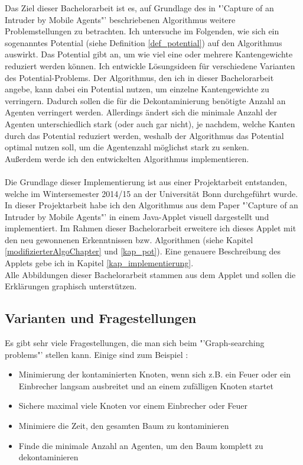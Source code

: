 Das Ziel dieser Bachelorarbeit ist es, auf Grundlage des in "'Capture of an Intruder by Mobile Agents"' \cite{cima_paper} beschriebenen Algorithmus weitere Problemstellungen zu betrachten. Ich untersuche im Folgenden, wie sich ein sogenanntes Potential (siehe Definition \ref{def_potential}) auf den Algorithmus auswirkt. Das Potential gibt an, um wie viel eine oder mehrere Kantengewichte reduziert werden können. Ich entwickle Lösungsideen für verschiedene Varianten des Potential-Problems. Der Algorithmus, den ich in dieser Bachelorarbeit angebe, kann dabei ein Potential nutzen, um einzelne Kantengewichte zu verringern. Dadurch sollen die für die Dekontaminierung benötigte Anzahl an Agenten verringert werden. Allerdings ändert sich die minimale Anzahl der Agenten unterschiedlich stark (oder auch gar nicht), je nachdem, welche Kanten durch das Potential reduziert werden, weshalb der Algorithmus das Potential optimal nutzen soll, um die Agentenzahl möglichst stark zu senken.\\
Außerdem werde ich den entwickelten Algorithmus implementieren.
\\
\\
Die Grundlage dieser Implementierung ist aus einer Projektarbeit entstanden, welche im Wintersemester 2014/15 an der Universität Bonn durchgeführt wurde.
In dieser Projektarbeit habe ich den Algorithmus aus dem Paper "'Capture of an Intruder by Mobile Agents"' \cite{cima_paper} in einem Java-Applet visuell dargestellt und implementiert. Im Rahmen dieser Bachelorarbeit erweitere ich dieses Applet mit den neu gewonnenen Erkenntnissen bzw. Algorithmen (siehe Kapitel \ref{modifizierterAlgoChapter} und \ref{kap_pot}). Eine genauere Beschreibung des Applets gebe ich in Kapitel \ref{kap_implementierung}.\\
Alle Abbildungen dieser Bachelorarbeit stammen aus dem Applet und sollen die Erklärungen graphisch unterstützen.



\subsection{Varianten und Fragestellungen}


Es gibt sehr viele Fragestellungen, die man sich beim "'Graph-searching problems"' stellen kann. Einige sind zum Beispiel \cite{firefighterproblem_paper}:
\begin{itemize}
	\item Minimierung der kontaminierten Knoten, wenn sich z.B. ein Feuer oder ein Einbrecher langsam ausbreitet und an einem zufälligen Knoten startet
	\item Sichere maximal viele Knoten vor einem Einbrecher oder Feuer
	\item Minimiere die Zeit, den gesamten Baum zu kontaminieren
	\item Finde die minimale Anzahl an  Agenten, um den Baum komplett zu dekontaminieren
\end{itemize}

